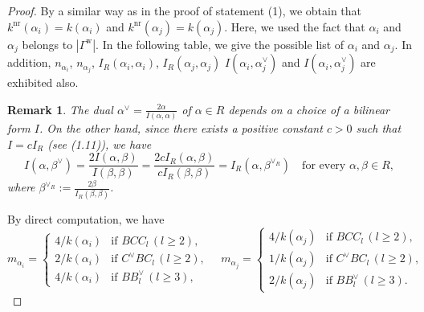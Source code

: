 \documentclass[11pt]{amsart}
\newcommand{\nr}{\mathrm{nr}}
\newcommand{\w}{\mathrm{w}}
\newtheorem{rem}[thm]{Remark}%
\begin{document}
{\begin{proof}
By a similar way as in the proof of statement (1), we  obtain that
$k^\nr(\alpha_i)=k(\alpha_i)$ and $k^\nr(\alpha_j)=k(\alpha_j)$. 
Here, we used  the fact that $\alpha_i$ and $\alpha_j$ belongs to $|\Gamma^\w|$.
In the following table, we give the possible list of 
$\alpha_i$ and $\alpha_j$. In addition, $n_{\alpha_i}$, $n_{\alpha_j}$, 
$I_R(\alpha_i,\alpha_i)$, $I_R(\alpha_j,\alpha_j)$
$I(\alpha_i,\alpha_j^\vee)$ and $I(\alpha_i,\alpha_j^\vee)$ are exhibited also. 
\begin{center}
\begin{table}[h]
\label{table1-alpha_i-alpha_j}
\vskip -2mm
\end{table}
\end{center}
\begin{rem} 
The dual $\alpha^\vee=\frac{2\alpha}{I(\alpha,\alpha)}$ of $\alpha\in R$
depends on a choice of a bilinear form $I$. On the other hand, since there exists 
a positive constant $c>0$ such that $I=cI_R$ {\rm (}see {\rm \cite{Saito1985} (1.11))}, 
we have
\[I(\alpha,\beta^\vee)=\frac{2I(\alpha,\beta)}{I(\beta,\beta)}=
\frac{2cI_R(\alpha,\beta)}{cI_R(\beta,\beta)}
=I_R(\alpha,\beta^{\vee_R})\quad \text{for every }\alpha,\beta\in R,\]
where $\beta^{\vee_R}:=\frac{2\beta}{I_R(\beta,\beta)}$.
\end{rem}
By direct computation, we have
\[m_{\alpha_i}=\begin{cases}
4/k(\alpha_i) & \text{if $BCC_l\, (l\geq 2)$},\\
2/k(\alpha_i) & \text{if $C^\vee BC_l\, (l\geq 2)$},\\
4/k(\alpha_i) & \text{if $BB^\vee_l\, (l\geq 3)$},
\end{cases}
\quad
m_{\alpha_j}=\begin{cases}
4/k(\alpha_j) & \text{if $BCC_l\, (l\geq 2)$},\\
1/k(\alpha_j) & \text{if $C^\vee BC_l\, (l\geq 2)$},\\
2/k(\alpha_j) & \text{if $BB^\vee_l\, (l\geq 3)$}.
\end{cases}
\]


\end{proof}}
\end{document}

